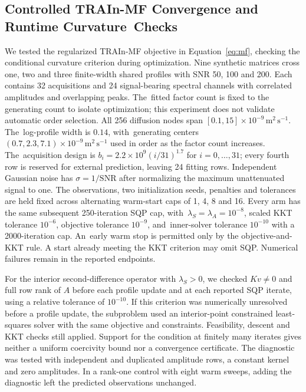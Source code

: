 \documentclass[mathematics,article,accept,moreauthors]{Definitions/mdpi}
\begin{document}
\subsection{Controlled TRAIn-MF Convergence and Runtime Curvature~Checks}\label{app:mfconvergence}
We tested the regularized TRAIn-MF objective in Equation~\eqref{eq:mf}, checking the conditional curvature criterion during optimization.
Nine synthetic matrices cross one, two and three finite-width shared profiles
with SNR 50, 100 and 200. Each contains 32 acquisitions and 24 signal-bearing
spectral channels with correlated amplitudes and overlapping peaks. The~fitted
factor count is fixed to the generating count to isolate optimization; this
experiment does not validate automatic order selection. All 256 diffusion
nodes span $[0.1,15]\times10^{-9}\,\mathrm{m^2\,s^{-1}}$. The~log-profile width is
$0.14$, with~generating centers $(0.7,2.3,7.1)\times10^{-9}\,\mathrm{m^2\,s^{-1}}$
used in order as the factor count increases. The~acquisition design is
$b_i=2.2\times10^9(i/31)^{1.7}$ for $i=0,\ldots,31$; every fourth row is reserved
for external prediction, leaving 24 fitting rows. Independent Gaussian noise
has $\sigma=1/\mathrm{SNR}$ after normalizing the maximum unattenuated signal to one.
The observations, two initialization seeds, penalties and tolerances are
held fixed across alternating warm-start caps of 1, 4, 8 and 16. Every arm has
the same subsequent 250-iteration SQP cap, with~$\lambda_S=\lambda_A=10^{-8}$,
scaled KKT tolerance $10^{-6}$, objective tolerance $10^{-9}$, and~inner-solver
tolerance $10^{-10}$ with a 2000-iteration cap. An~early warm stop is permitted only
by the objective-and-KKT rule. A start already meeting the KKT criterion may omit SQP. Numerical failures remain in the reported endpoints.




For the interior second-difference operator with $\lambda_S>0$, we checked $Kv\ne0$ and full row rank of $A$ before each profile update and at each reported SQP iterate, using a relative tolerance of $10^{-10}$. If this criterion was numerically unresolved before a profile update, the subproblem used an interior-point constrained least-squares solver with the same objective and constraints. Feasibility, descent and KKT checks still applied. Support for the condition at finitely many iterates gives neither a uniform coercivity bound nor a convergence certificate. The diagnostic was tested with independent and duplicated amplitude rows, a constant kernel and zero amplitudes. In a rank-one control with eight warm sweeps, adding the diagnostic left the predicted observations unchanged.
\end{document}
